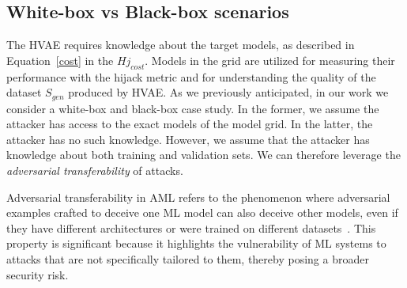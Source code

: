 \subsection{White-box vs Black-box scenarios}
The HVAE requires knowledge about the target models, as described in Equation~\ref{cost} in the $Hj_{cost}$. Models in the grid are utilized for measuring their performance with the hijack metric and for understanding the quality of the dataset $S_{gen}$ produced by HVAE.
As we previously anticipated, in our work we consider a white-box and black-box case study. In the former, we assume the attacker has access to the exact models of the model grid. In the latter, the attacker has no such knowledge.
However, we assume that the attacker has knowledge about both training and validation sets. We can therefore leverage the \textit{adversarial transferability} of attacks. 
\par
Adversarial transferability in AML refers to the phenomenon where adversarial examples crafted to deceive one ML model can also deceive other models, even if they have different architectures or were trained on different datasets~\cite{demontis2019adversarial, alecci2023your}. This property is significant because it highlights the vulnerability of ML systems to attacks that are not specifically tailored to them, thereby posing a broader security risk.